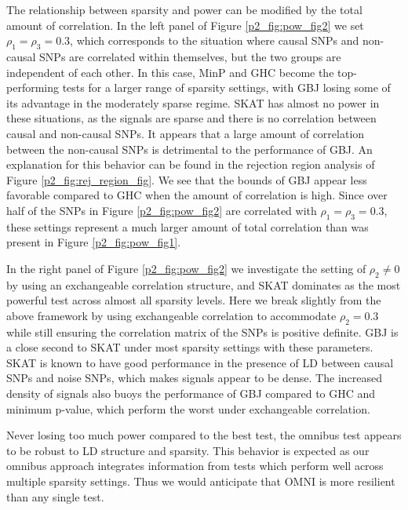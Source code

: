 \documentclass[12pt]{article}
\begin{document}
The relationship between sparsity and power can be modified by the total amount 
of correlation.
In the left panel of Figure \ref{p2_fig:pow_fig2} we set $\rho_{1}=\rho_{3}=0.3$, which 
corresponds to the situation where causal SNPs and non-causal SNPs are correlated 
within themselves, but the two groups are independent of each other.
In this case, MinP and GHC become the top-performing tests for a larger range of 
sparsity settings, with GBJ losing some of its advantage in the moderately sparse regime.
SKAT has almost no power in these situations, as the signals are sparse and there is
no correlation between causal and non-causal SNPs.
It appears that a large amount of correlation between the non-causal SNPs is 
detrimental to the performance of GBJ. 
An explanation for this behavior can be found in the rejection region analysis of 
Figure \ref{p2_fig:rej_region_fig}. 
We see that the bounds of GBJ appear less favorable compared to GHC when the 
amount of correlation is high. 
Since over half of the SNPs in Figure \ref{p2_fig:pow_fig2} are correlated with $\rho_{1}=\rho_{3}=0.3$,
these settings represent a much larger amount of total correlation than was present in 
Figure \ref{p2_fig:pow_fig1}. 

In the right panel of Figure \ref{p2_fig:pow_fig2} we investigate the setting of $\rho_{2}\neq0$ 
by using an exchangeable correlation structure, and SKAT dominates
as the most powerful test across almost all sparsity levels. 
Here we break slightly from the above framework by using exchangeable correlation
 to accommodate $\rho_{2}=0.3$ while still ensuring the correlation matrix of the SNPs is positive definite.  
GBJ is a close second to SKAT under most sparsity settings with these parameters.
SKAT is known to have good performance in the presence of LD between causal SNPs 
and noise SNPs, which makes signals appear to be dense. 
The increased density of signals also buoys the performance of GBJ compared to
GHC and minimum p-value, which perform the worst under exchangeable correlation.

Never losing too much power compared to the best test, the omnibus test appears to 
be robust to LD structure and sparsity.
This behavior is expected as our omnibus approach integrates information from tests which perform well 
across multiple sparsity settings.
Thus we would anticipate that OMNI is more resilient than any single test.
\end{document}
